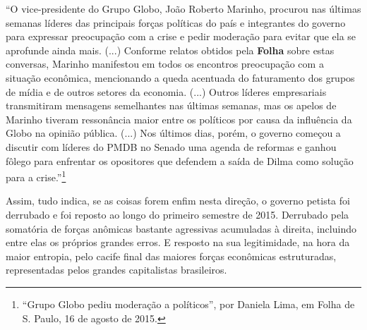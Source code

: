 ``O vice-presidente do Grupo Globo, João Roberto Marinho, procurou nas
últimas semanas líderes das principais forças políticas do país e
integrantes do governo para expressar preocupação com a crise e pedir
moderação para evitar que ela se aprofunde ainda mais. (...) Conforme
relatos obtidos pela \textbf{Folha} sobre estas conversas, Marinho
manifestou em todos os encontros preocupação com a situação econômica,
mencionando a queda acentuada do faturamento dos grupos de mídia e de
outros setores da economia. (...) Outros líderes empresariais
transmitiram mensagens semelhantes nas últimas semanas, mas os apelos de
Marinho tiveram ressonância maior entre os políticos por causa da
influência da Globo na opinião pública. (...) Nos últimos dias, porém, o
governo começou a discutir com líderes do PMDB no Senado uma agenda de
reformas e ganhou fôlego para enfrentar os opositores que defendem a
saída de Dilma como solução para a crise.''\footnote{``Grupo Globo pediu
  moderação a políticos'', por Daniela Lima, em Folha de S. Paulo, 16 de
  agosto de 2015.}

Assim, tudo indica, se as coisas forem enfim nesta direção, o governo
petista foi derrubado e foi reposto ao longo do primeiro semestre de
2015. Derrubado pela somatória de forças anômicas bastante agressivas
acumuladas à direita, incluindo entre elas os próprios grandes erros. E
resposto na sua legitimidade, na hora da maior entropia, pelo cacife
final das maiores forças econômicas estruturadas, representadas pelos
grandes capitalistas brasileiros.

